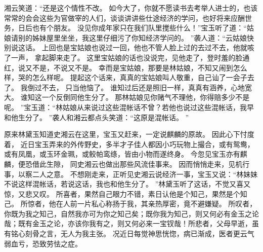 湘云笑道：“还是这个情性不改。
如今大了，你就不愿读书去考举人进士的，也该常常的会会这些为官做宰的人们，谈谈讲讲些仕途经济的学问，也好将来应酬世务，日后也有个朋友。
没见你成年家只在我们队里搅些什么！”宝玉听了道：“姑娘请别的姊妹屋里坐坐，我这里仔细污了你知经济学问的。
”袭人道：“云姑娘快别说这话。
上回也是宝姑娘也说过一回，他也不管人脸上过的去过不去，他就咳了一声，
拿起脚来走了。
这里宝姑娘的话也没说完，见他走了，登时羞的脸通红，说又不是，不说又不是。
幸而是宝姑娘，那要是林姑娘，不知又闹到怎么样，哭的怎么样呢。
提起这个话来，真真的宝姑娘叫人敬重，自己讪了一会子去了。
我倒过不去，
只当他恼了。
谁知过后还是照旧一样，真真有涵养，心地宽大。
谁知这一个反倒同他生分了。
那林姑娘见你赌气不理他，你得赔多少不是呢。
”宝玉道：“林姑娘从来说过这些混帐话不曾？若他也说过这些混帐话，我早和他生分了。
”袭人和湘云都点头笑道：“这原是混帐话。
”\par
原来林黛玉知道史湘云在这里，宝玉又赶来，一定说麒麟的原故。
因此心下忖度着，
近日宝玉弄来的外传野史，多半才子佳人都因小巧玩物上撮合，或有鸳鸯，或有凤凰，或玉环金珮，或鲛帕鸾绦，皆由小物而遂终身。
今忽见宝玉亦有麒麟，便恐借此生隙，
同史湘云也做出那些风流佳事来。
因而悄悄走来，见机行事，以察二人之意。
不想刚走来，正听见史湘云说经济一事，宝玉又说：“林妹妹不说这样混帐话，若说这话，我也和他生分了。
”林黛玉听了这话，不觉又喜又惊，又悲又叹。
所喜者，果然自己眼力不错，素日认他是个知己，果然是个知己。
所惊者，他在人前一片私心称扬于我，其亲热厚密，竟不避嫌疑。
所叹者，你既为我之知己，自然我亦可为你之知己矣；既你我为知己，则又何必有金玉之论哉；既有金玉之论，亦该你我有之，则又何必来一宝钗哉！所悲者，父母早逝，虽有铭心刻骨之言，无人为我主张。
况近日每觉神思恍惚，病已渐成，医者更云气弱血亏，恐致劳怯之症。
